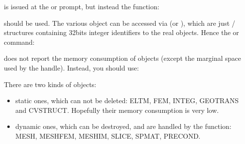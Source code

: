 \documentclass[a4paper,11pt,english]{sphinxmanual}
\begin{document}
\begin{sphinxVerbatim}[commandchars=\\\{\}]
  
\end{sphinxVerbatim}

is issued at the  or  prompt, but instead the function:

\begin{sphinxVerbatim}[commandchars=\\\{\}]
 
\end{sphinxVerbatim}

should be used. The various  object can be accessed via  (or
), which are just  /  structures containing 32\sphinxhyphen{}bits integer
identifiers to the real objects. Hence the  or  command:

\begin{sphinxVerbatim}[commandchars=\\\{\}]
 
\end{sphinxVerbatim}

does not report the memory consumption of  objects (except the marginal space
used by the handle). Instead, you should use:

\begin{sphinxVerbatim}[commandchars=\\\{\}]
 
\end{sphinxVerbatim}

There are two kinds of  objects:
\begin{itemize}
\item {} 
static ones, which can not be deleted: ELTM, FEM, INTEG, GEOTRANS and CVSTRUCT.
Hopefully their memory consumption is very low.

\item {} 
dynamic ones, which can be destroyed, and are handled by the 
function: MESH, MESHFEM, MESHIM, SLICE, SPMAT, PRECOND.

\end{itemize}
\end{document}
